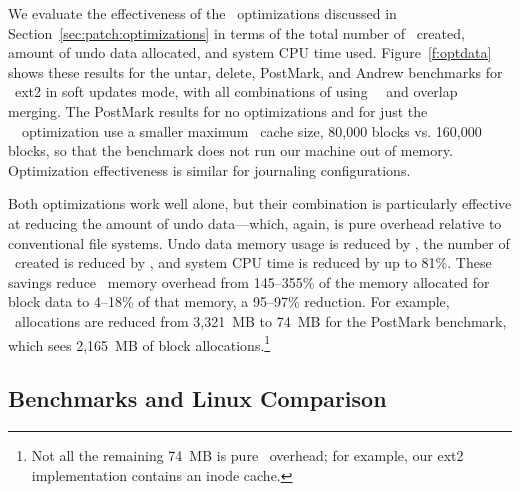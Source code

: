 \opttable{}

We evaluate the effectiveness of the \patch\ optimizations discussed in
Section~\ref{sec:patch:optimizations} in terms of
%
the total number of \patches\ created, amount of undo data allocated,
and system CPU time used.
%
Figure~\ref{f:optdata} shows these results for the untar, delete,
PostMark, and Andrew benchmarks for \Kudos\ ext2 in soft updates mode,
with all combinations of using \nrb\ \patches\ and overlap merging.
%
The PostMark results for no optimizations and for just the \nrb\
\patches\ optimization use a smaller maximum \Kudos\ cache size,
80,000 blocks vs. 160,000 blocks, so that the benchmark does not run
our machine out of memory.
%
Optimization effectiveness is similar for journaling configurations.

Both optimizations work well alone, but their combination is particularly
effective at reducing the amount of undo data---which, again, is pure
overhead relative to conventional file systems.
%
Undo data memory usage is reduced by \patchoptundo,
%
the number of \patches\ created is reduced by \patchoptcount,
%
and system CPU time is reduced by up to 81\%.
%
These savings reduce \Kudos\ memory overhead
%
from 145--355\% of the memory allocated for block data
to 4--18\% of that memory, a 95--97\% reduction. For
example, \Kudos\ allocations are reduced from 3,321~MB to 74~MB for
the PostMark benchmark, which sees 2,165~MB of block
allocations.\footnote{Not all the remaining 74~MB is pure \Featherstitch\
overhead; for example, our ext2 implementation contains an inode cache.}


\begin{comment}
\begin{figure}[t]
\vspace{-0.5\baselineskip}
\centering{
\texttt{[image: rb\_patch\_size]}
}
\vspace{-0.5\baselineskip}
\caption{\label{fig:patchsize-histo} \Rb\ \patch\ size histogram for a sample
workload (extracting a large archive into ext2). All the \patches\ larger than
63 bytes have been optimized into \nrb\ \patches. \Rb\ \patches\ 4 bytes and
smaller account for about 51\% of all \rb\ \patches.}
\end{figure}
\end{comment}

\subsection{Benchmarks and Linux Comparison}
\label{sec:eval:bench}

